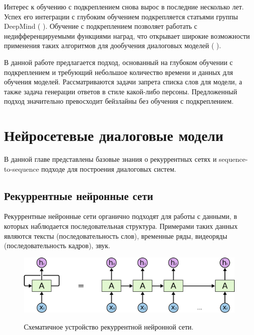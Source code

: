 \documentclass[12pt,a4paper]{amsart}
\begin{document}
Интерес к обучению с подкреплением снова вырос в последние несколько лет. Успех его интеграции с глубоким обучением подкрепляется статьями группы DeepMind  (\cite{DBLP:journals/corr/MnihKSGAWR13} \cite{silver2016mastering}). Обучение с подкреплением позволяет работать с недифференцируемыми функциями наград, что открывает широкие возможности применения таких алгоритмов для дообучения диалоговых моделей (\cite{DBLP:journals/corr/AsadiW16} \cite{DBLP:journals/corr/BordesW16} \cite{DBLP:journals/corr/LiMRGGJ16} \cite{DBLP:journals/corr/LiptonGLLAD16} \cite{DBLP:journals/corr/PengLLGCLW17}).

В данной работе предлагается подход, основанный на глубоком обучении с подкреплением и требующий небольшое количество времени и данных для обучения моделей. Рассматриваются задачи запрета списка слов для модели, а также задача генерации ответов в стиле какой-либо персоны. Предложенный подход значительно превосходит бейзлайны без обучения с подкреплением.

\pagebreak
\section{Нейросетевые диалоговые модели}

В данной главе представлены базовые знания о рекуррентных сетях и sequence-to-sequence подходе для построения диалоговых систем.

\subsection{Рекуррентные нейронные сети}

Рекуррентные нейронные сети органично подходят для работы с данными, в которых наблюдается последовательная структура. Примерами таких данных являются тексты (последовательность слов), временные ряды, видеоряды (последовательность кадров), звук.

\begin{figure}[h]
	\caption{Схематичное устройство рекуррентной нейронной сети.}
	\includegraphics[width=\textwidth]{imgs/RNN-unrolled.png}
	\label{fig:rnn-overview}
	\centering
\end{figure}
\end{document}
